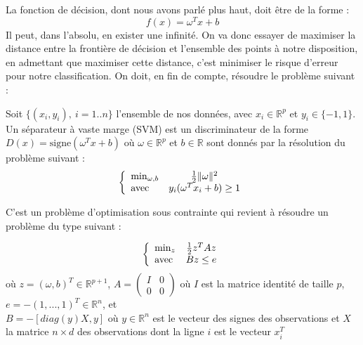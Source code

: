 \bigskip
La fonction de décision, dont nous avons parlé plus haut, doit être de la forme :
\[f(x)=\omega^Tx+b\]
Il peut, dans l'absolu, en exister une infinité. On va donc essayer de maximiser la distance entre la frontière de décision et l'ensemble des points à notre disposition, en admettant que maximiser cette distance, c'est minimiser le risque d'erreur pour notre classification. On doit, en fin de compte, résoudre le problème suivant :
\begin{center}
	Soit $\{(x_i,y_i),\ i=1..n\}$ l'ensemble de nos données, avec $x_i\in\mathbb{R}^p$ et $y_i\in\{-1,1\}$. Un séparateur à vaste marge (SVM) est un discriminateur de la forme $D(x)=\text{signe}(\omega^Tx+b)$ où $\omega\in\mathbb{R}^p$ et $b\in\mathbb{R}$ sont donnés par la résolution du problème suivant :
	\[\left\{\begin{array}{l c}
	\min_{\omega,b} & \frac{1}{2} \|\omega\|^2\\
	\text{avec } & y_i(\omega^Tx_i+b)\geq 1
	\end{array}\right.\]
\end{center}

C'est un problème d'optimisation sous contrainte qui revient à résoudre un problème du type suivant :

	\[\left\{\begin{array}{l c}
	\min_z & \frac{1}{2} z^TAz\\
	\text{avec } & Bz\leq e
	\end{array}\right.\]
où $z=(\omega,b)^T\in\mathbb{R}^{p+1}$, $A=\begin{pmatrix} I & 0 \\ 0 & 0 \end{pmatrix}$ où $I$ est la matrice identité de taille $p$, $e=-(1,...,1)^T\in\mathbb{R}^n$, et \\$B=-[diag(y)X,y]$ où $y\in\mathbb{R}^n$ est le vecteur des signes des observations et $X$ la matrice $n\times d$ des observations dont la ligne $i$ est le vecteur $x_i^T$

